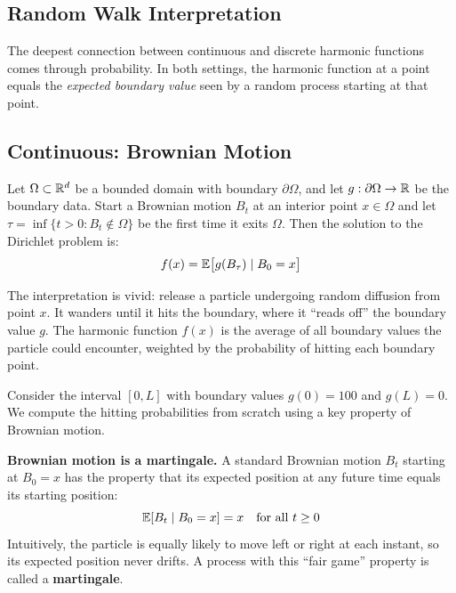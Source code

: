 \begin{notechapter}
\section{Random Walk Interpretation}
\label{harmonic-functions:sec:random_walks}

The deepest connection between continuous and discrete harmonic functions
comes through probability. In both settings, the harmonic function at a
point equals the \emph{expected boundary value} seen by a random process
starting at that point.

\subsection{Continuous: Brownian Motion}

\begin{theorem}[Kakutani, 1944]
\label{harmonic-functions:thm:kakutani}
Let $\Omega \subset \mathbb{R}^d$ be a bounded domain with boundary
$\partial\Omega$, and let $g : \partial\Omega \to \mathbb{R}$ be the boundary data.
Start a Brownian motion $B_t$ at an interior point $x \in \Omega$ and let
$\tau = \inf\{t > 0 : B_t \notin \Omega\}$ be the first time it exits
$\Omega$. Then the solution to the Dirichlet problem is:
\begin{equation}
f(x) = \mathbb{E}\bigl[g(B_\tau) \mid B_0 = x\bigr]
\end{equation}
\end{theorem}

The interpretation is vivid: release a particle undergoing random
diffusion from point $x$. It wanders until it hits the boundary, where it
``reads off'' the boundary value $g$. The harmonic function $f(x)$ is the
average of all boundary values the particle could encounter, weighted by
the probability of hitting each boundary point.

\begin{examplebox}[title=Brownian Motion on the 1D Rod]
Consider the interval $[0, L]$ with boundary values $g(0) = 100$ and
$g(L) = 0$. We compute the hitting probabilities from scratch using a
key property of Brownian motion.

\textbf{Brownian motion is a martingale.} A standard Brownian motion $B_t$
starting at $B_0 = x$ has the property that its expected position at any
future time equals its starting position:
\[
\mathbb{E}[B_t \mid B_0 = x] = x \quad \text{for all } t \geq 0
\]
Intuitively, the particle is equally likely to move left or right at each
instant, so its expected position never drifts. A process with this
``fair game'' property is called a \textbf{martingale}.


\end{examplebox}
\end{notechapter}
